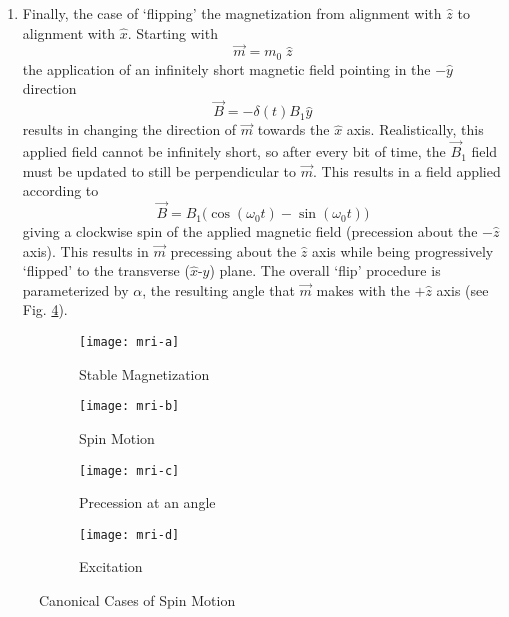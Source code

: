 \begin{enumerate}
\item Finally, the case of `flipping' the magnetization from alignment with $\hat{z}$ to alignment with $\hat{x}$. Starting with \begin{equation}
\vec{m} = m_0\; \hat{z}
\end{equation} the application of an infinitely short magnetic field pointing in the $-\hat{y}$ direction 
\begin{equation}
\vec{B} = -\delta(t)B_1\hat{y}
\end{equation}results in changing the direction of $\vec{m}$ towards the $\hat{x}$ axis. Realistically, this applied field cannot be infinitely short, so after every bit of time, the $\vec{B}_1$ field must be updated to still be perpendicular to $\vec{m}$. This results in a field applied according to
\begin{equation}
\vec{B}=B_1\big(\cos\left(\omega_0 t\right) - \sin\left(\omega_0 t\right)\big)
\end{equation}
giving a clockwise spin of the applied magnetic field (precession about the $-\hat{z}$ axis). This results in $\vec{m}$ precessing about the $\hat{z}$ axis while being progressively `flipped' to the transverse ($\hat{x}$-$\hat{y}$) plane. The overall `flip' procedure is parameterized by $\alpha$, the resulting angle that $\vec{m}$ makes with the $+\hat{z}$ axis (see Fig. \ref{fig:mri:flip}).

\end{enumerate}

\begin{figure}[ht]
	\centering
	\begin{subfigure}[b]{0.22\textwidth}
		\centering
		\texttt{[image: mri-a]}
		\caption{Stable Magnetization}
		\label{fig:mri:stable}
	\end{subfigure}\hfill
	\begin{subfigure}[b]{0.22\textwidth}
		\centering
		\texttt{[image: mri-b]}
		\caption{Spin Motion}
		\label{fig:mri:precession}
	\end{subfigure}\hfill
	\begin{subfigure}[b]{0.22\textwidth}
		\centering
		\texttt{[image: mri-c]}
		\caption{Precession at an angle}
		\label{fig:mri:decay}
	\end{subfigure}\hfill
	\begin{subfigure}[b]{0.22\textwidth}
		\centering
		\texttt{[image: mri-d]}
		\caption{Excitation}
		\label{fig:mri:flip}
	\end{subfigure}
	\caption{Canonical Cases of Spin Motion}\label{fig:mri:cases}
\end{figure}

